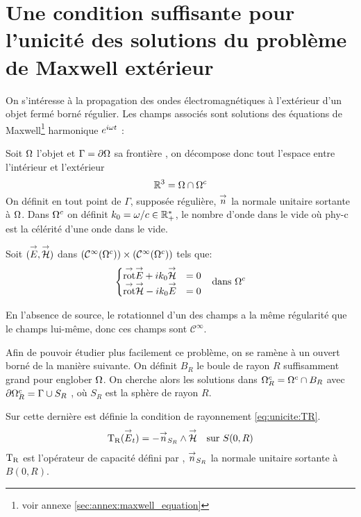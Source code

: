 \section[Une CSU des solutions du problème de Maxwell extérieur]{Une condition suffisante pour l'unicité des solutions du problème de Maxwell extérieur}


  On s’intéresse à la propagation des ondes électromagnétiques à l'extérieur d'un objet fermé borné régulier. Les champs associés sont solutions des équations de Maxwell\footnote{voir annexe \ref{sec:annex:maxwell_equation}} harmonique \(e^{i\omega t}\) :

  Soit \(\Omega\) l'objet et \(\Gamma=\partial\Omega\) sa frontière , on décompose donc tout l'espace entre l'intérieur et l'extérieur 
  \[
    \mathbb R^3 = \Omega\cap\Omega^c
  \]
  On définit en tout point de \(\Gamma\), supposée régulière, \({\overset{\rightarrow}{n}}\) la normale unitaire sortante à \(\Omega\).
 Dans \(\Omega^c\) on définit \(k_0=\omega / c \in \mathbb R_+^*\), le nombre d'onde dans le vide où \gls{phy-c} est la célérité d'une onde dans le vide.

  Soit \(({\overset{\rightarrow}{E}},{\overset{\rightarrow}{\mathcal{H}}})\) dans \((\mathcal{C}^\infty(\Omega^c)) \times (\mathcal{C}^\infty(\Omega^c))\) tels que:
  \begin{align}
  \left\lbrace
    \begin{matrix}
      {{\overset{\rightarrow}{\operatorname{rot}}}} {\overset{\rightarrow}{E}} + i k_0 {\overset{\rightarrow}{\mathcal{H}}} &= 0
      \\
      {{\overset{\rightarrow}{\operatorname{rot}}}} {\overset{\rightarrow}{\mathcal{H}}} - i k_0 {\overset{\rightarrow}{E}} &= 0
    \end{matrix}
    \right. && \text{dans \(\Omega^c\)}
    \label{eq:unicite:maxwell_ext}
  \end{align}

  En l'absence de source, le rotationnel d'un des champs a la même régularité que le champs lui-même, donc ces champs sont \(\mathcal{C}^\infty\).

  Afin de pouvoir étudier plus facilement ce problème, on se ramène à un ouvert borné de la manière suivante. On définit \(B_R\) le boule de rayon \(R\) suffisamment grand pour englober \(\Omega\). On cherche alors les solutions dans \(\Omega^c_R=\Omega^c\cap B_R\) avec \(\partial\Omega^c_R = \Gamma\cup S_R\) , où \(S_R\) est la sphère de rayon \(R\).

  Sur cette dernière est définie la condition de rayonnement \eqref{eq:unicite:TR}.
  \begin{equation}
    \label{eq:unicite:TR}
    \begin{aligned}
    \operatorname{T_R}({\overset{\rightarrow}{E}}_t) = - {\overset{\rightarrow}{n}}_{S_R} \wedge {\overset{\rightarrow}{\mathcal{H}}} && \text{sur \(S(0,R)\)}
    \end{aligned}
  \end{equation}
  \(\operatorname{T_R}\) est l'opérateur de capacité défini par \cite[p.~200]{nedelec_acoustic_2001}, \({\overset{\rightarrow}{n}}_{S_R}\) la normale unitaire sortante à \(B(0,R)\).

